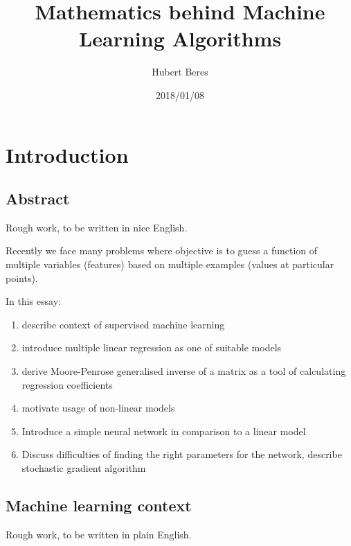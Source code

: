 \documentclass[a4paper]{article}
\title{Mathematics behind Machine Learning Algorithms}
\author{Hubert Beres}
\date{2018/01/08}
\theoremstyle{break}
\begin{document}
\maketitle

\section{Introduction}

\subsection{Abstract}
Rough work, to be written in nice English.

Recently we face many problems where objective is to guess a function of multiple variables (features) based on multiple examples (values at particular points).

In this essay:

\begin{enumerate}
    \item describe context of supervised machine learning
    \item introduce multiple linear regression as one of suitable models
    \item derive Moore-Penrose generalised inverse of a matrix as a tool of calculating regression coefficients
    \item motivate usage of non-linear models
    \item Introduce a simple neural network in comparison to a linear model
    \item Discuss difficulties of finding the right parameters for the network, describe stochastic gradient algorithm
\end{enumerate}

\subsection{Machine learning context}

Rough work, to be written in plain English.
\end{document}

